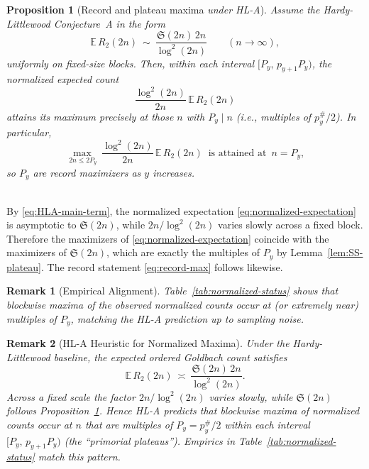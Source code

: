 \documentclass[11pt]{article}
\makeatletter
\theoremstyle{inline}
\newtheorem*{remark}{Remark}
\theoremstyle{break}
\renewenvironment{proof}[1][\proofname]{%
  \par\pushQED{\qed}%
  \normalfont \topsep6\p@\@plus6\p@\relax
  \trivlist
  \item[\hskip\labelsep
        \itshape
    #1\@addpunct{.}]\mbox{}\\  %
}{%
  \popQED\endtrivlist\@endpefalse
}
\theoremstyle{break}
\theoremstyle{break}
\theoremstyle{break}
\newtheorem{proposition}{Proposition}
\theoremstyle{break}
\theoremstyle{break}
\theoremstyle{break}
\theoremstyle{inline}
\makeatother
\begin{document}
\begin{proposition}[Record and plateau maxima \emph{under HL-A}]\label{prop:primorial-plateau}
Assume the Hardy-Littlewood Conjecture~A in the form
\begin{equation}\label{eq:HLA-main-term}
\mathbb E\,R_2(2n)\ \sim\ \frac{\mathfrak S(2n)\,2n}{\log^2(2n)}\qquad(n\to\infty),
\end{equation}
uniformly on fixed-size blocks. Then, within each interval $[P_y,\,p_{y+1}P_y)$, the \emph{normalized} expected count
\begin{equation}\label{eq:normalized-expectation}
\frac{\log^2(2n)}{2n}\,\mathbb E\,R_2(2n)
\end{equation}
attains its maximum precisely at those $n$ with $P_y\mid n$ (i.e., multiples of $p_y^\#/2$). In particular,
\begin{equation}\label{eq:record-max}
\max_{\,2n\le 2P_y}\ \frac{\log^2(2n)}{2n}\,\mathbb E\,R_2(2n)
\ \text{ is attained at }\, n=P_y,
\end{equation}
so $P_y$ are record maximizers as $y$ increases.
\end{proposition}

\begin{proof}
By \eqref{eq:HLA-main-term}, the normalized expectation \eqref{eq:normalized-expectation} is asymptotic to $\mathfrak S(2n)$, while $2n/\log^2(2n)$ varies slowly across a fixed block. Therefore the maximizers of \eqref{eq:normalized-expectation} coincide with the maximizers of $\mathfrak S(2n)$, which are exactly the multiples of $P_y$ by Lemma~\ref{lem:SS-plateau}. The record statement \eqref{eq:record-max} follows likewise.
\end{proof}

\begin{remark}[Empirical Alignment]
Table~\ref{tab:normalized-status} shows that blockwise maxima of the observed normalized counts occur at (or extremely near) multiples of $P_y$, matching the HL-A prediction up to sampling noise.
\end{remark}

\begin{remark}[HL-A Heuristic for Normalized Maxima]
Under the Hardy-Littlewood baseline, the expected ordered Goldbach count satisfies
\begin{equation}\label{eq:HLA-main-term}
\mathbb E\,R_2(2n)\ \asymp\ \frac{\mathfrak S(2n)\,2n}{\log^2(2n)}.
\end{equation}
Across a fixed scale the factor \(2n/\log^2(2n)\) varies slowly, while \(\mathfrak S(2n)\) follows Proposition~\ref{prop:primorial-plateau}. Hence HL-A predicts that \emph{blockwise maxima} of normalized counts occur at \(n\) that are multiples of \(P_y=p_y^\#/2\) within each interval \([P_y,\,p_{y+1}P_y)\) (the “primorial plateaus”). Empirics in Table~\ref{tab:normalized-status} match this pattern.
\end{remark}
\end{document}
